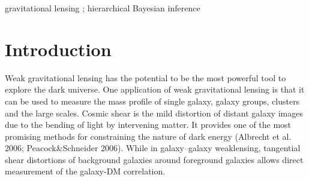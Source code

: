 \documentclass[useAMS,usenatbib]{mn2e}
\begin{document}
\begin{keywords}
  gravitational lensing ; hierarchical Bayesian inference
\end{keywords}

\setcounter{footnote}{1}




\section{Introduction}

\label{sec:intro}










Weak gravitational lensing has the potential to be the most powerful
tool to explore the dark universe. One application of weak gravitational lensing is
that it can be used to measure the mass profile of single galaxy, galaxy
groups, clusters and the large scales. Cosmic shear is the mild distortion
of distant galaxy images due to the bending of light by intervening
matter. It provides one of the most promising methods for constraining
the nature of dark energy (Albrecht et al. 2006; Peacock\&Schneider
2006). While in galaxy--galaxy weaklensing, tangential shear distortions
of background galaxies around foreground galaxies allows direct measurement
of the galaxy-DM correlation.
\end{document}
